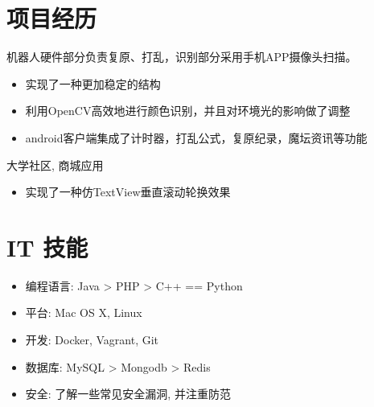\documentclass{resume}
\begin{document}
\pagestyle{empty}

\section{项目经历}
\begin{onehalfspacing}
机器人硬件部分负责复原、打乱，识别部分采用手机APP摄像头扫描。
\begin{itemize}
  \item 实现了一种更加稳定的结构
  \item 利用OpenCV高效地进行颜色识别，并且对环境光的影响做了调整
  \item android客户端集成了计时器，打乱公式，复原纪录，魔坛资讯等功能
\end{itemize}
\end{onehalfspacing}

\begin{onehalfspacing}
大学社区, 商城应用
\begin{itemize}
  \item 实现了一种仿TextView垂直滚动轮换效果
\end{itemize}
\end{onehalfspacing}

\section{IT 技能}
\begin{onehalfspacing}
\begin{itemize}[parsep=0.5ex]
  \item 编程语言: Java > PHP > C++ == Python
  \item 平台: Mac OS X, Linux
  \item 开发: Docker, Vagrant, Git
  \item 数据库: MySQL > Mongodb > Redis
  \item 安全: 了解一些常见安全漏洞, 并注重防范
\end{itemize}
\end{onehalfspacing}
\end{document}
